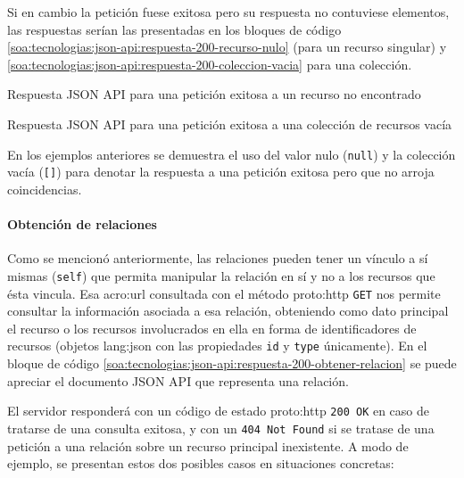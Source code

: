 Si en cambio la petición fuese exitosa pero su respuesta no contuviese elementos, las respuestas serían las presentadas en los bloques de código \autoref{soa:tecnologias:json-api:respuesta-200-recurso-nulo} (para un recurso singular) y \autoref{soa:tecnologias:json-api:respuesta-200-coleccion-vacia} para una colección.

\begin{listing}
  \caption{Respuesta JSON API para una petición exitosa a un recurso no encontrado}
  \label{soa:tecnologias:json-api:respuesta-200-recurso-nulo}
\end{listing}

\begin{listing}
  \caption{Respuesta JSON API para una petición exitosa a una colección de recursos vacía}
  \label{soa:tecnologias:json-api:respuesta-200-coleccion-vacia}
\end{listing}

En los ejemplos anteriores se demuestra el uso del valor nulo (\texttt{null}) y la colección vacía (\texttt{[]}) para denotar la respuesta a una petición exitosa pero que no arroja coincidencias.

\paragraph{Obtención de relaciones}

Como se mencionó anteriormente, las relaciones pueden tener un vínculo a sí mismas (\texttt{self}) que permita manipular la relación en sí y no a los recursos que ésta vincula. Esa \gls{acro:url} consultada con el método \gls{proto:http} \texttt{GET} nos permite consultar la información asociada a esa relación, obteniendo como dato principal el recurso o los recursos involucrados en ella en forma de identificadores de recursos (objetos \gls{lang:json} con las propiedades \texttt{id} y \texttt{type} únicamente). En el bloque de código \autoref{soa:tecnologias:json-api:respuesta-200-obtener-relacion} se puede apreciar el documento JSON API que representa una relación.

El servidor responderá con un código de estado \gls{proto:http} \texttt{200 OK} en caso de tratarse de una consulta exitosa, y con un \texttt{404 Not Found} si se tratase de una petición a una relación sobre un recurso principal inexistente. A modo de ejemplo, se presentan estos dos posibles casos en situaciones concretas:


